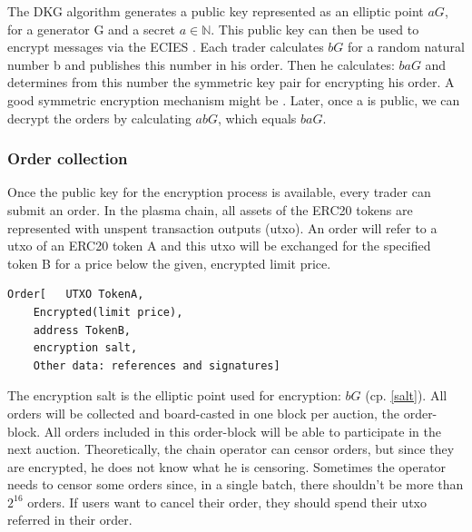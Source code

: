 \documentclass[11pt,parskip=full]{scrartcl}%
\begin{document}
The DKG algorithm generates a public key represented as an elliptic point $aG\label{public key}$, for a generator G and a secret $a\in \mathbb{N}$. This public key can then be used to encrypt messages via the ECIES \cite{ECIES}. Each trader calculates $bG \label{salt}$ for a random natural number b and publishes this number in his order. Then he calculates: $baG$ and determines from this number the symmetric key pair for encrypting his order. A good symmetric encryption mechanism might be \cite{cipher}. Later, once a is public, we can decrypt the orders by calculating $abG$, which equals $baG$.


\subsubsection{Order collection}
\label{orderblock}
Once the public key for the encryption process is available, every trader can submit an order. In the plasma chain, all assets of the ERC20 tokens are represented with unspent transaction outputs (utxo). An order will refer to a utxo of an ERC20 token A and this utxo will be exchanged for the specified token B for a price below the given, encrypted limit price.
\begin{lstlisting}
Order[   UTXO TokenA,
	Encrypted(limit price),
	address TokenB,
	encryption salt,
	Other data: references and signatures]
\end{lstlisting} 
The encryption salt is the elliptic point used for encryption:  $bG$ (cp. \ref{salt}).
All orders will be collected and board-casted in one block per auction, the order-block. All orders included in this order-block will be able to participate in the next auction. Theoretically, the chain operator can censor orders, but since they are encrypted, he does not know what he is censoring. Sometimes the operator needs to censor some orders since, in a single batch, there shouldn't be more than $2^{16}$ orders.  If users want to cancel their order, they should spend their utxo referred in their order.
\end{document}

